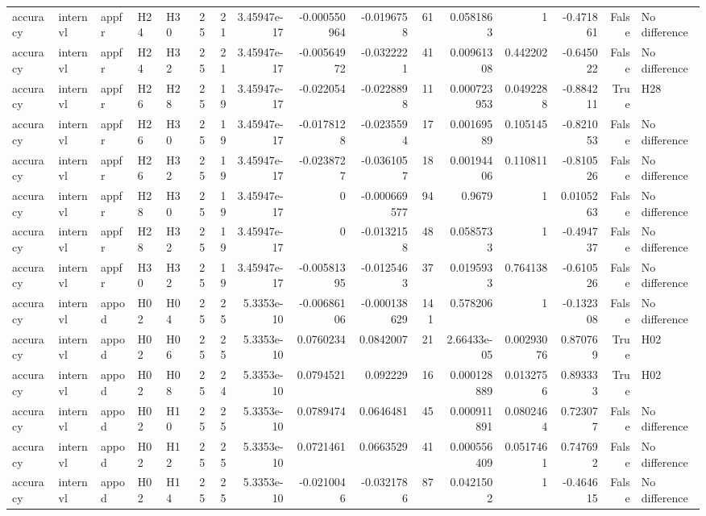 \begin{longtable}{lllllrrrrrrrrrrl}
accuracy & internvl & appfr & H24 & H30 & 25 & 21 & 3.45947e-17 & -0.000550964 & -0.0196758 & 61 & 0.0581863 & 1 & -0.471861 & False & No difference \\
accuracy & internvl & appfr & H24 & H32 & 25 & 21 & 3.45947e-17 & -0.00564972 & -0.0322221 & 41 & 0.00961308 & 0.442202 & -0.645022 & False & No difference \\
accuracy & internvl & appfr & H26 & H28 & 25 & 19 & 3.45947e-17 & -0.022054 & -0.0228898 & 11 & 0.000723953 & 0.0492288 & -0.884211 & True & H28 \\
accuracy & internvl & appfr & H26 & H30 & 25 & 19 & 3.45947e-17 & -0.0178128 & -0.0235594 & 17 & 0.00169589 & 0.105145 & -0.821053 & False & No difference \\
accuracy & internvl & appfr & H26 & H32 & 25 & 19 & 3.45947e-17 & -0.0238727 & -0.0361057 & 18 & 0.00194406 & 0.110811 & -0.810526 & False & No difference \\
accuracy & internvl & appfr & H28 & H30 & 25 & 19 & 3.45947e-17 & 0 & -0.000669577 & 94 & 0.9679 & 1 & 0.0105263 & False & No difference \\
accuracy & internvl & appfr & H28 & H32 & 25 & 19 & 3.45947e-17 & 0 & -0.0132158 & 48 & 0.0585733 & 1 & -0.494737 & False & No difference \\
accuracy & internvl & appfr & H30 & H32 & 25 & 19 & 3.45947e-17 & -0.00581395 & -0.0125463 & 37 & 0.0195933 & 0.764138 & -0.610526 & False & No difference \\
accuracy & internvl & appod & H02 & H04 & 25 & 25 & 5.3353e-10 & -0.00686106 & -0.000138629 & 141 & 0.578206 & 1 & -0.132308 & False & No difference \\
accuracy & internvl & appod & H02 & H06 & 25 & 25 & 5.3353e-10 & 0.0760234 & 0.0842007 & 21 & 2.66433e-05 & 0.00293076 & 0.870769 & True & H02 \\
accuracy & internvl & appod & H02 & H08 & 25 & 24 & 5.3353e-10 & 0.0794521 & 0.092229 & 16 & 0.000128889 & 0.0132756 & 0.893333 & True & H02 \\
accuracy & internvl & appod & H02 & H10 & 25 & 25 & 5.3353e-10 & 0.0789474 & 0.0646481 & 45 & 0.000911891 & 0.0802464 & 0.723077 & False & No difference \\
accuracy & internvl & appod & H02 & H12 & 25 & 25 & 5.3353e-10 & 0.0721461 & 0.0663529 & 41 & 0.000556409 & 0.0517461 & 0.747692 & False & No difference \\
accuracy & internvl & appod & H02 & H14 & 25 & 25 & 5.3353e-10 & -0.0210046 & -0.0321786 & 87 & 0.0421502 & 1 & -0.464615 & False & No difference \\

\end{longtable}
